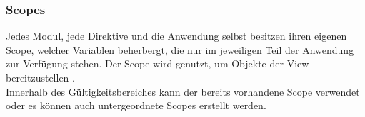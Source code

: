 \subsubsection{Scopes}
Jedes Modul, jede Direktive und die Anwendung selbst besitzen ihren eigenen Scope, welcher Variablen beherbergt, die nur im jeweiligen Teil der Anwendung zur Verfügung stehen. Der Scope wird genutzt, um Objekte der View bereitzustellen  \cite[S. 37]{ste15}. \\
Innerhalb des Gültigkeitsbereiches kann der bereits vorhandene Scope verwendet oder es können auch untergeordnete Scopes erstellt werden. \cite[S. 52]{ste15}